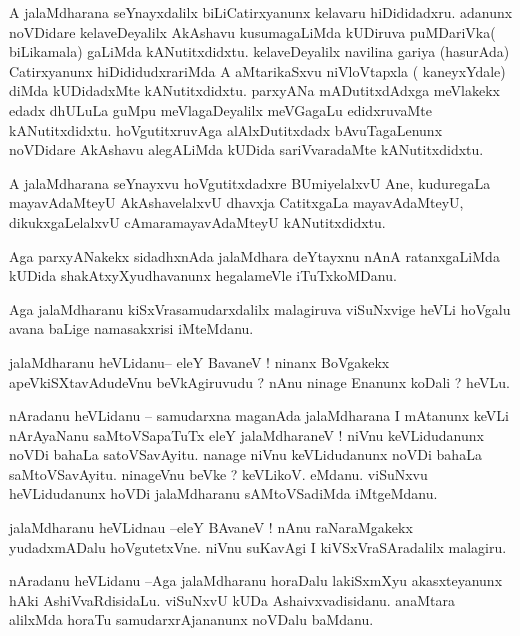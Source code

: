 \documentclass{article}
\begin{document}
\begin{mn}%
A jalaMdharana seYnayxdalilx biLiCatirxyanunx kelavaru hiDididadxru. adanunx noVDidare 
kelaveDeyalilx AkAshavu kusumagaLiMda kUDiruva puMDariVka( biLikamala) gaLiMda 
kANutitxdidxtu. kelaveDeyalilx navilina gariya (hasurAda) Catirxyanunx hiDididudxrariMda A 
aMtarikaSxvu niVloVtapxla ( kaneyxYdale) diMda kUDidadxMte kANutitxdidxtu. parxyANa 
mADutitxdAdxga meVlakekx edadx dhULuLa guMpu meVlagaDeyalilx meVGagaLu edidxruvaMte 
kANutitxdidxtu. hoVgutitxruvAga alAlxDutitxdadx bAvuTagaLenunx noVDidare AkAshavu 
alegALiMda kUDida sariVvaradaMte kANutitxdidxtu.
\end{mn}

\begin{mn}%
A jalaMdharana seYnayxvu hoVgutitxdadxre BUmiyelalxvU Ane, kuduregaLa mayavAdaMteyU 
AkAshavelalxvU dhavxja CatitxgaLa mayavAdaMteyU, dikukxgaLelalxvU cAmaramayavAdaMteyU 
kANutitxdidxtu.
\end{mn}

\begin{mn}%
Aga parxyANakekx sidadhxnAda jalaMdhara deYtayxnu nAnA ratanxgaLiMda kUDida 
shakAtxyXyudhavanunx hegalameVle iTuTxkoMDanu.
\end{mn}

\begin{mn}%
Aga jalaMdharanu kiSxVrasamudarxdalilx malagiruva viSuNxvige heVLi hoVgalu avana baLige 
namasakxrisi iMteMdanu.
\end{mn}

\begin{mn}%
jalaMdharanu heVLidanu-- eleY BavaneV ! ninanx BoVgakekx apeVkiSXtavAdudeVnu beVkAgiruvudu ?
nAnu ninage Enanunx koDali ? heVLu.
\end{mn}

\begin{mn}%
nAradanu heVLidanu -- samudarxna maganAda jalaMdharana I mAtanunx keVLi nArAyaNanu 
saMtoVSapaTuTx eleY jalaMdharaneV ! niVnu keVLidudanunx noVDi bahaLa satoVSavAyitu. nanage 
niVnu keVLidudanunx noVDi bahaLa saMtoVSavAyitu. ninageVnu beVke ? keVLikoV. eMdanu. 
viSuNxvu heVLidudanunx hoVDi jalaMdharanu sAMtoVSadiMda iMtgeMdanu.
\end{mn}

\begin{mn}%
jalaMdharanu heVLidnau --eleY BAvaneV ! nAnu raNaraMgakekx yudadxmADalu hoVgutetxVne. niVnu 
suKavAgi I kiVSxVraSAradalilx malagiru.
\end{mn}

\begin{mn}%
nAradanu heVLidanu --Aga jalaMdharanu horaDalu lakiSxmXyu akasxteyanunx hAki 
AshiVvaRdisidaLu. viSuNxvU kUDa Ashaivxvadisidanu. anaMtara alilxMda horaTu 
samudarxrAjananunx noVDalu baMdanu.
\end{mn}
\end{document}
